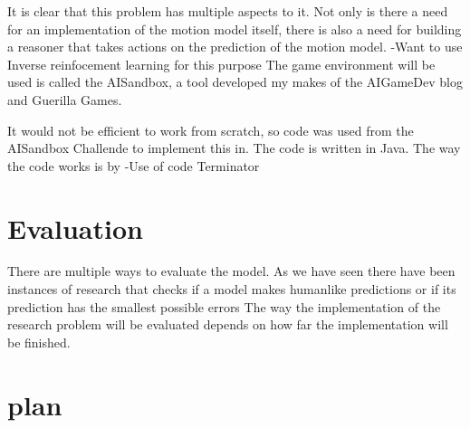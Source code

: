 \documentclass[a4paper, 12pt]{article}
\begin{document}
It is clear that this problem has multiple aspects to it. Not
only is there a need for an implementation of the motion model itself, there is
also a need for building a reasoner that takes actions on the prediction of the
motion model.
-Want to use Inverse reinfocement learning for this purpose
The game environment will be used is called the AISandbox, a tool developed my
makes of the AIGameDev blog and Guerilla Games.

It would not be efficient to work from scratch, so code was used from the
AISandbox Challende to implement this in. The code is written in Java. The way
the code works is by 
-Use of code Terminator

\section{Evaluation}
There are multiple ways to evaluate the model. As we have seen there have been
instances of research that checks if a model makes humanlike predictions %
or if its prediction has the smallest possible errors %
The way the implementation of the research problem will be evaluated depends on
how far the implementation will be finished.

\section{plan}



\end{document}
